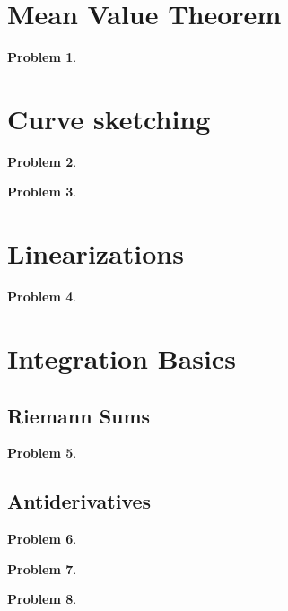 \documentclass{article}
\newtheorem{problem}{Problem}
\begin{document}
\section{Mean Value Theorem}
\begin{problem}

\end{problem}


\section{Curve sketching}
\begin{problem}

\end{problem}


\begin{problem}

\end{problem}

\section{Linearizations}
\begin{problem}

\end{problem}



\section{Integration Basics}
\subsection{Riemann Sums}
\begin{problem}

\end{problem}


\subsection{Antiderivatives}
\begin{problem}

\end{problem}
\begin{problem}

\end{problem}
\begin{problem}

\end{problem}
\end{document}
